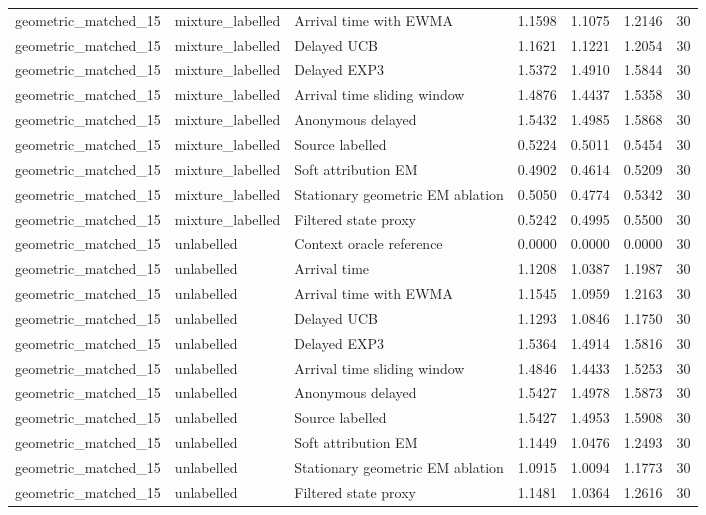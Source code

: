 \begin{tabular}{llllllr}
geometric\_matched\_15 & mixture\_labelled & Arrival time with EWMA & 1.1598 & 1.1075 & 1.2146 & 30 \\
geometric\_matched\_15 & mixture\_labelled & Delayed UCB & 1.1621 & 1.1221 & 1.2054 & 30 \\
geometric\_matched\_15 & mixture\_labelled & Delayed EXP3 & 1.5372 & 1.4910 & 1.5844 & 30 \\
geometric\_matched\_15 & mixture\_labelled & Arrival time sliding window & 1.4876 & 1.4437 & 1.5358 & 30 \\
geometric\_matched\_15 & mixture\_labelled & Anonymous delayed & 1.5432 & 1.4985 & 1.5868 & 30 \\
geometric\_matched\_15 & mixture\_labelled & Source labelled & 0.5224 & 0.5011 & 0.5454 & 30 \\
geometric\_matched\_15 & mixture\_labelled & Soft attribution EM & 0.4902 & 0.4614 & 0.5209 & 30 \\
geometric\_matched\_15 & mixture\_labelled & Stationary geometric EM ablation & 0.5050 & 0.4774 & 0.5342 & 30 \\
geometric\_matched\_15 & mixture\_labelled & Filtered state proxy & 0.5242 & 0.4995 & 0.5500 & 30 \\
geometric\_matched\_15 & unlabelled & Context oracle reference & 0.0000 & 0.0000 & 0.0000 & 30 \\
geometric\_matched\_15 & unlabelled & Arrival time & 1.1208 & 1.0387 & 1.1987 & 30 \\
geometric\_matched\_15 & unlabelled & Arrival time with EWMA & 1.1545 & 1.0959 & 1.2163 & 30 \\
geometric\_matched\_15 & unlabelled & Delayed UCB & 1.1293 & 1.0846 & 1.1750 & 30 \\
geometric\_matched\_15 & unlabelled & Delayed EXP3 & 1.5364 & 1.4914 & 1.5816 & 30 \\
geometric\_matched\_15 & unlabelled & Arrival time sliding window & 1.4846 & 1.4433 & 1.5253 & 30 \\
geometric\_matched\_15 & unlabelled & Anonymous delayed & 1.5427 & 1.4978 & 1.5873 & 30 \\
geometric\_matched\_15 & unlabelled & Source labelled & 1.5427 & 1.4953 & 1.5908 & 30 \\
geometric\_matched\_15 & unlabelled & Soft attribution EM & 1.1449 & 1.0476 & 1.2493 & 30 \\
geometric\_matched\_15 & unlabelled & Stationary geometric EM ablation & 1.0915 & 1.0094 & 1.1773 & 30 \\
geometric\_matched\_15 & unlabelled & Filtered state proxy & 1.1481 & 1.0364 & 1.2616 & 30 \\

\end{tabular}
